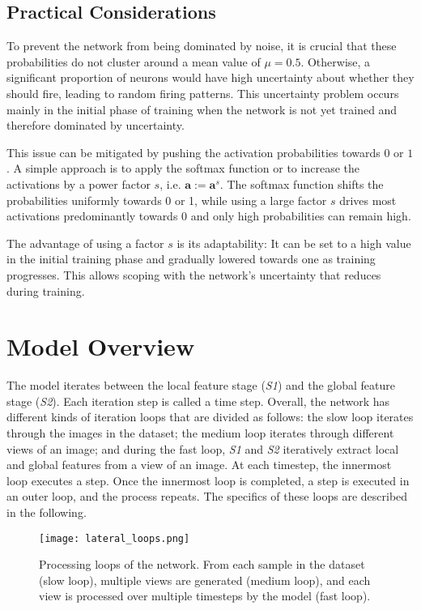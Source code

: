 \subsection{Practical Considerations}
To prevent the network from being dominated by noise, it is crucial that these probabilities do not cluster around a mean value of $\mu = 0.5$. Otherwise, a significant proportion of neurons would have high uncertainty about whether they should fire, leading to random firing patterns. This uncertainty problem occurs mainly in the initial phase of training when the network is not yet trained and therefore dominated by uncertainty.

This issue can be mitigated by pushing the activation probabilities towards $0$ or $1$. A simple approach is to apply the softmax function or to increase the activations by a power factor $s$, i.e. $\boldsymbol{a} := \boldsymbol{a}^s$. The softmax function shifts the probabilities uniformly towards 0 or 1, while using a large factor $s$ drives most activations predominantly towards 0 and only high probabilities can remain high.

The advantage of using a factor $s$ is its adaptability: It can be set to a high value in the initial training phase and gradually lowered towards one as training progresses. This allows scoping with the network's uncertainty that reduces during training.

\section{Model Overview}
The model iterates between the local feature stage (\emph{S1}) and the global feature stage (\emph{S2}).
Each iteration step is called a time step.
Overall, the network has different kinds of iteration loops that are divided as follows:
the slow loop iterates through the images in the dataset; the medium loop iterates through different views of an image; and during the fast loop, \emph{S1} and \emph{S2} iteratively extract local and global features from a view of an image.
At each timestep, the innermost loop executes a step. Once the innermost loop is completed, a step is executed in an outer loop, and the process repeats. The specifics of these loops are described in the following.

\begin{figure}[h]
    \centering
    \texttt{[image: lateral\_loops.png]}
    \caption[Processing loops of the network]{Processing loops of the network. From each sample in the dataset (slow loop), multiple views are generated (medium loop), and each view is processed over multiple timesteps by the model (fast loop).}
\end{figure}

